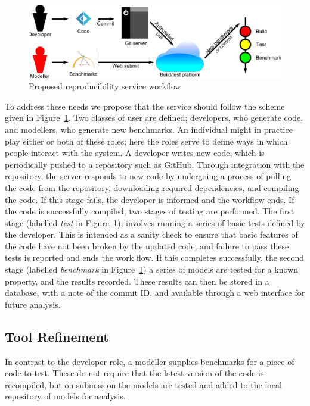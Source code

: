 \documentclass{llncs}
\begin{document}
\begin{figure}[!ht]
	\centering
	\includegraphics[width=\textwidth]{workflow}
	\caption{Proposed reproducibility service workflow}
	\label{schematic}
\end{figure}
	
To address these needs we propose that the service should follow the
scheme given in Figure~\ref{schematic}. Two classes of user are
defined; developers, who generate code, and modellers, who generate
new benchmarks. An individual might in practice play either or both of
these roles; here the roles serve to define ways in which people
interact with the system. A developer writes new code, which is
periodically pushed to a repository such as GitHub. Through
integration with the repository, the server responds to new code by
undergoing a process of pulling the code from the repository,
downloading required dependencies, and compiling the code. If this
stage fails, the developer is informed and the workflow ends. If the
code is successfully compiled, two stages of testing are
performed. The first stage (labelled {\emph{test}} in
Figure~\ref{schematic}), involves running a series of basic tests
defined by the developer. This is intended as a sanity check to ensure
that basic features of the code have not been broken by the updated
code, and failure to pass these tests is reported and ends the work
flow. If this completes successfully, the second stage (labelled
{\emph{benchmark}} in Figure~\ref{schematic}) a series of models are
tested for a known property, and the results recorded. These results
can then be stored in a database, with a note of the commit ID, and
available through a web interface for future analysis.

\subsection{Tool Refinement}

In contrast to the developer role, a modeller supplies benchmarks for
a piece of code to test. These do not require that the latest version
of the code is recompiled, but on submission the models are tested and
added to the local repository of models for analysis. 
\end{document}
